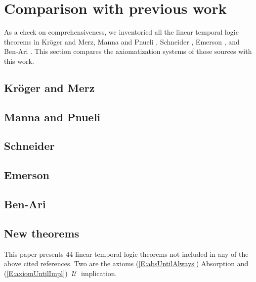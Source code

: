 \documentclass[12pt, fleqn, leqno]{article}
\newcommand{\Until}{\;\mathcal{U}\;}
\begin{document}
\section{Comparison with previous work}\label{comparison-previous-work}

As a check on comprehensiveness, we inventoried all the linear temporal logic theorems in Kröger and Merz\cite{Kroger}, Manna and Pnueli \cite{Manna}, Schneider \cite{Schn}, Emerson \cite{Emer}, and Ben-Ari \cite{Ben}.
This section compares the axiomatization systems of those sources with this work.

\subsection{Kröger and Merz}

\subsection{Manna and Pnueli}

\subsection{Schneider}

\subsection{Emerson}

\subsection{Ben-Ari}

\subsection{New theorems}

This paper presents 44 linear temporal logic theorems not included in any of the above cited references.
Two are the axioms
(\ref{E:absUntilAlways}) Absorption and
(\ref{E:axiomUntilImpl}) $\Until$ implication.
\end{document}
